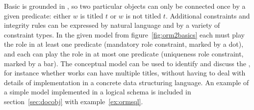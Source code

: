 Basic  is grounded in , so two particular
objects can only be connected once by a given predicate: either $w$ is titled
$t$ or $w$ is not titled $t$. Additional constraints and integrity rules can be
expressed by natural language and by a variety of  constraint types.
In the given model from figure~\ref{fig:orm2basics} each  must
play the  role in at least one  predicate
(mandatory role constraint, marked by a dot), and each  can play
the  role in at most one  predicate
(uniqueness role constraint, marked by a bar).  The conceptual model can be
used to identify and discuss the , for instance
whether works can have multiple titles, without having to deal with details of
implementation in a concrete data structuring language. An example of a simple
 model implemented in a logical schema is included in
section~\ref{sec:docobj} with example~\ref{ex:ormsql}.
